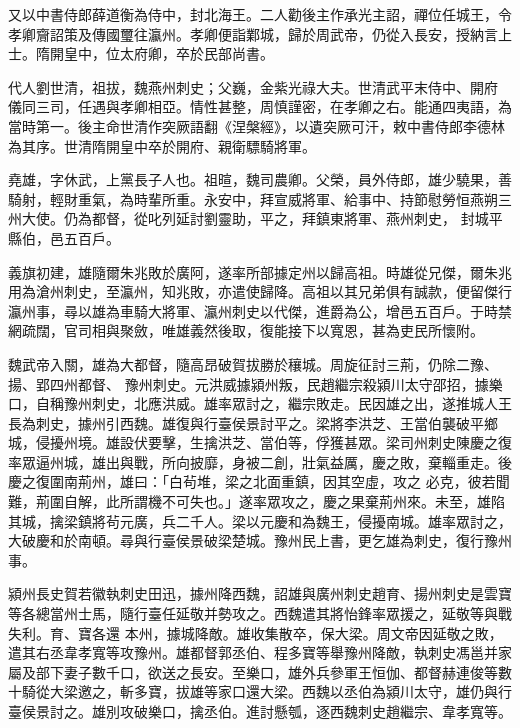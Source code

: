 \begin{pinyinscope}
 又以中書侍郎薛道衡為侍中，封北海王。二人勸後主作承光主詔，禪位任城王，令孝卿齎詔策及傳國璽往瀛州。孝卿便詣鄴城，歸於周武帝，仍從入長安，授納言上士。隋開皇中，位太府卿，卒於民部尚書。



 代人劉世清，祖拔，魏燕州刺史；父巍，金紫光祿大夫。世清武平末侍中、開府
 儀同三司，任遇與孝卿相亞。情性甚整，周慎謹密，在孝卿之右。能通四夷語，為當時第一。後主命世清作突厥語翻《涅槃經》，以遺突厥可汗，敕中書侍郎李德林為其序。世清隋開皇中卒於開府、親衛驃騎將軍。



 堯雄，字休武，上黨長子人也。祖暄，魏司農卿。父榮，員外侍郎，雄少驍果，善騎射，輕財重氣，為時輩所重。永安中，拜宣威將軍、給事中、持節慰勞恒燕朔三州大使。仍為都督，從叱列延討劉靈助，平之，拜鎮東將軍、燕州刺史，
 封城平縣伯，邑五百戶。



 義旗初建，雄隨爾朱兆敗於廣阿，遂率所部據定州以歸高祖。時雄從兄傑，爾朱兆用為滄州刺史，至瀛州，知兆敗，亦遣使歸降。高祖以其兄弟俱有誠款，便留傑行瀛州事，尋以雄為車騎大將軍、瀛州刺史以代傑，進爵為公，增邑五百戶。于時禁網疏闊，官司相與聚斂，唯雄義然後取，復能接下以寬恩，甚為吏民所懷附。



 魏武帝入關，雄為大都督，隨高昂破賀拔勝於穰城。周旋征討三荊，仍除二豫、揚、郢四州都督、
 豫州刺史。元洪威據潁州叛，民趙繼宗殺潁川太守邵招，據樂口，自稱豫州刺史，北應洪威。雄率眾討之，繼宗敗走。民因雄之出，遂推城人王長為刺史，據州引西魏。雄復與行臺侯景討平之。梁將李洪芝、王當伯襲破平鄉城，侵擾州境。雄設伏要擊，生擒洪芝、當伯等，俘獲甚眾。梁司州刺史陳慶之復率眾逼州城，雄出與戰，所向披靡，身被二創，壯氣益厲，慶之敗，棄輜重走。後慶之復圍南荊州，雄曰：「白茍堆，梁之北面重鎮，因其空虛，攻之
 必克，彼若聞難，荊圍自解，此所謂機不可失也。」遂率眾攻之，慶之果棄荊州來。未至，雄陷其城，擒梁鎮將茍元廣，兵二千人。梁以元慶和為魏王，侵擾南城。雄率眾討之，大破慶和於南頓。尋與行臺侯景破梁楚城。豫州民上書，更乞雄為刺史，復行豫州事。



 潁州長史賀若徽執刺史田迅，據州降西魏，詔雄與廣州刺史趙育、揚州刺史是雲寶等各總當州士馬，隨行臺任延敬并勢攻之。西魏遣其將怡鋒率眾援之，延敬等與戰失利。育、寶各還
 本州，據城降敵。雄收集散卒，保大梁。周文帝因延敬之敗，遣其右丞韋孝寬等攻豫州。雄都督郭丞伯、程多寶等舉豫州降敵，執刺史馮邕并家屬及部下妻子數千口，欲送之長安。至樂口，雄外兵參軍王恒伽、都督赫連俊等數十騎從大梁邀之，斬多寶，拔雄等家口還大梁。西魏以丞伯為潁川太守，雄仍與行臺侯景討之。雄別攻破樂口，擒丞伯。進討懸瓠，逐西魏刺史趙繼宗、韋孝寬等。




\end{pinyinscope}
